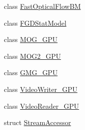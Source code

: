 \begin{DoxyCompactItemize}
\item 
class \hyperlink{classcv_1_1gpu_1_1FastOpticalFlowBM}{Fast\-Optical\-Flow\-B\-M}
\item 
class \hyperlink{classcv_1_1gpu_1_1FGDStatModel}{F\-G\-D\-Stat\-Model}
\item 
class \hyperlink{classcv_1_1gpu_1_1MOG__GPU}{M\-O\-G\-\_\-\-G\-P\-U}
\item 
class \hyperlink{classcv_1_1gpu_1_1MOG2__GPU}{M\-O\-G2\-\_\-\-G\-P\-U}
\item 
class \hyperlink{classcv_1_1gpu_1_1GMG__GPU}{G\-M\-G\-\_\-\-G\-P\-U}
\item 
class \hyperlink{classcv_1_1gpu_1_1VideoWriter__GPU}{Video\-Writer\-\_\-\-G\-P\-U}
\item 
class \hyperlink{classcv_1_1gpu_1_1VideoReader__GPU}{Video\-Reader\-\_\-\-G\-P\-U}
\item 
struct \hyperlink{structcv_1_1gpu_1_1StreamAccessor}{Stream\-Accessor}
\end{DoxyCompactItemize}
